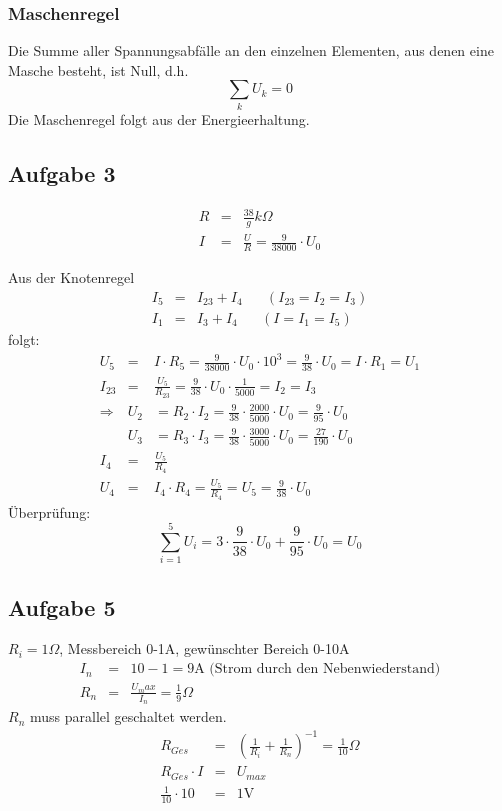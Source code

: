 \documentclass[12pt,a4paper]{article}
\begin{document}
\subsubsection*{Maschenregel}
Die Summe aller Spannungsabf\"alle an den einzelnen Elementen, aus denen eine Masche besteht, ist Null, d.h.
\[ \sum_kU_k = 0\]
Die Maschenregel folgt aus der Energieerhaltung.

\subsection*{Aufgabe 3}
\begin{eqnarray*}
R & = & \frac{38}{g} k\Omega \\
I & = & \frac{U}{R} = \frac{9}{38000} \cdot U_0
\end{eqnarray*}

Aus der Knotenregel
\begin{eqnarray*}
I_5 & = & I_{23} + I_4 \hspace{20pt} ( I_{23} = I_2 = I_3 ) \\
I_1 & = & I_3 + I_4 \hspace{20pt} ( I = I_1 = I_5 )
\end{eqnarray*}
folgt:
\begin{eqnarray*}
U_5 & = & I \cdot R_5 = \frac{9}{38000} \cdot U_0 \cdot 10^3 = \frac{9}{38} \cdot U_0 = I \cdot R_1 = U_1 \\
I_{23} & = & \frac{U_5}{R_{23}} = \frac{9}{38} \cdot U_0 \cdot \frac{1}{5000} = I_2 = I_3 \\
\Rightarrow & U_2 & = R_2 \cdot I_2 = \frac{9}{38} \cdot \frac{2000}{5000} \cdot U_0 = \frac{9}{95} \cdot U_0 \\
& U_3 & = R_3 \cdot I_3 = \frac{9}{38} \cdot \frac{3000}{5000} \cdot U_0 = \frac{27}{190} \cdot U_0 \\
I_4 & = & \frac{U_5}{R_4} \\
U_4 & = & I_4 \cdot R_4 = \frac{U_5}{R_4} = U_5 = \frac{9}{38} \cdot U_0
\end{eqnarray*}
\"Uberpr\"ufung:
\[ \sum_{i=1}^5 U_i = 3 \cdot \frac{9}{38} \cdot U_0 + \frac{9}{95} \cdot U_0 = U_0 \]

\subsection*{Aufgabe 5}
$R_i = 1\Omega$, Messbereich 0-1A, gew\"unschter Bereich 0-10A
\begin{eqnarray*}
I_n & = & 10 - 1 = 9\mbox{A (Strom durch den Nebenwiederstand)} \\
R_n & = & \frac{U_max}{I_n} = \frac{1}{9}  \Omega
\end{eqnarray*}
$R_n$ muss parallel geschaltet werden.
\begin{eqnarray*}
R_{Ges} & = & \left( \frac{1}{R_i} + \frac{1}{R_n} \right) ^{-1} = \frac{1}{10}\Omega \\
R_{Ges} \cdot I & = & U_{max} \\
\frac{1}{10} \cdot 10 & = & 1 \mbox{V}
\end{eqnarray*}
\end{document}
